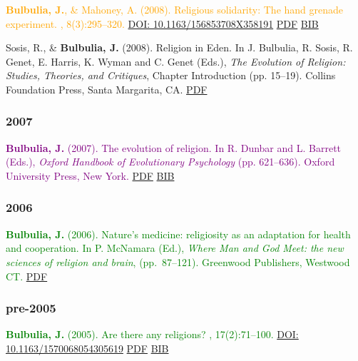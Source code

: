 \documentclass{article}
\begin{document}
\begin{thebibliography}{99}
\textcolor{Orange}{
{\bf Bulbulia, J.}, \& Mahoney, A. (2008).
\newblock Religious solidarity: The hand grenade experiment.
, 8(3):295--320.
\href{https://doi.org/10.1163/156853708X358191}{DOI: 10.1163/156853708X358191} \newblock} \href{http://db.tt/0969FhI}{PDF} \href{https://scholar.google.co.nz/scholar.bib?q=info:ez_RmJh3ov8J:scholar.google.com/&output=citation&scisig=AAGBfm0AAAAAVQSZK_McRldG-i1APaLH3OkcaGDXrgxr&scisf=4&hl=en}{BIB}


Sosis, R., \& {\bf Bulbulia, J.} (2008).
\newblock Religion in Eden.
\newblock In J. Bulbulia, R. Sosis, R. Genet, E. Harris, K. Wyman and
  C. Genet (Eds.), {\em The Evolution of Religion: Studies, Theories, and
  Critiques}, Chapter Introduction (pp. 15--19). Collins Foundation Press,
  Santa Margarita, CA. \href{http://db.tt/nSs5qqb}{PDF}



\subsubsection*{2007}



\textcolor{Purple}{
{\bf Bulbulia, J.} (2007).
\newblock The evolution of religion.
\newblock In R. Dunbar and L. Barrett (Eds.), {\em Oxford Handbook of
  Evolutionary Psychology} (pp. 621--636). Oxford University
  Press, New York.} \href{http://db.tt/nSs5qqb}{PDF} \href{https://www.dropbox.com/s/owcmsyw09umhc1x/theEvoReligion.bib?dl=0}{BIB}


\subsubsection*{2006}
\textcolor{Green}{
{\bf Bulbulia, J.} (2006).
\newblock Nature's medicine: religiosity as an adaptation for health and
  cooperation.
\newblock In P. McNamara (Ed.), {\em Where Man and God Meet: the new
  sciences of religion and brain}, (pp.~87--121). Greenwood
  Publishers, Westwood CT.} \href{http://db.tt/HFNrN38}{PDF}



\subsubsection*{pre-2005}



\textcolor{Green}{
{\bf Bulbulia, J.} (2005).
\newblock Are there any religions?
, 17(2):71--100. 
\href{https://doi.org/10.1163/1570068054305619}{DOI: 10.1163/1570068054305619}} \href{http://db.tt/IUco0fj}{PDF} \href{https://scholar.google.co.nz/scholar.bib?q=info:VkW9oOZSmf8J:scholar.google.com/&output=citation&scisig=AAGBfm0AAAAAVQSb1HVG338RqWQkIIV6dbi-5mWgu0GN&scisf=4&hl=en}{BIB}



\end{thebibliography}
\end{document}
